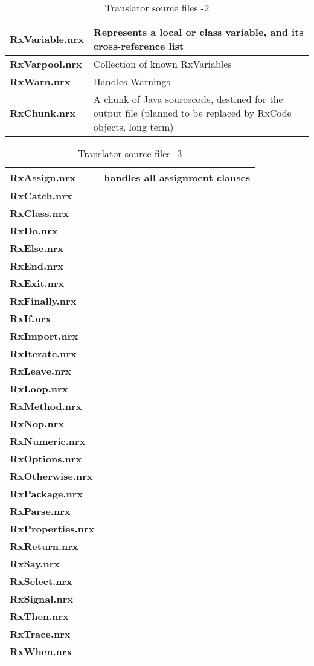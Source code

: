 {\begin{table}
\begin{tabularx}{\textwidth}{>{\bfseries}lX}
\\\midrule
\end{tabularx}
\end{table}
\begin{table}\caption{Translator source files -2}
\begin{tabularx}{\textwidth}{>{\bfseries}lX}
\toprule
  RxVariable.nrx      & Represents a local or class variable, and its
                         cross-reference list
\\\midrule
  RxVarpool.nrx       & Collection of known RxVariables
\\\midrule
  RxWarn.nrx          & Handles Warnings
\\\midrule
  RxChunk.nrx         & A chunk of Java sourcecode, destined for the
  output file (planned to be replaced by RxCode objects, long term)
\\\midrule
\end{tabularx}
\end{table}
\begin{table}\caption{Translator source files -3}
\begin{tabularx}{\textwidth}{>{\bfseries}lX}
\toprule
  RxAssign.nrx& handles all assignment clauses
\\\midrule
  RxCatch.nrx       &
\\\midrule
  RxClass.nrx &
\\\midrule
  RxDo.nrx&
\\\midrule
  RxElse.nrx&
\\\midrule
  RxEnd.nrx&
\\\midrule
  RxExit.nrx&
\\\midrule
  RxFinally.nrx&
\\\midrule
  RxIf.nrx&
\\\midrule
  RxImport.nrx&
\\\midrule
  RxIterate.nrx&
\\\midrule
  RxLeave.nrx&
\\\midrule
  RxLoop.nrx&
\\\midrule
  RxMethod.nrx&
\\\midrule
  RxNop.nrx&
\\\midrule
  RxNumeric.nrx&
\\\midrule
  RxOptions.nrx&
\\\midrule
  RxOtherwise.nrx&
\\\midrule
  RxPackage.nrx&
\\\midrule
  RxParse.nrx&
\\\midrule
  RxProperties.nrx&
\\\midrule
  RxReturn.nrx&
\\\midrule
  RxSay.nrx&
\\\midrule
  RxSelect.nrx&
\\\midrule
  RxSignal.nrx&
\\\midrule
  RxThen.nrx&
\\\midrule
  RxTrace.nrx&
\\\midrule
  RxWhen.nrx&
\\\bottomrule
\end{tabularx}
\end{table}

}
